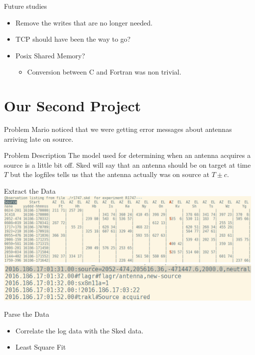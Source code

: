 \documentclass{beamer}
\begin{document}
    \begin{frame}{Future studies}
        \begin{itemize}[<+-|alert@+>]
            \item Remove the writes that are no longer needed.
            \item TCP should have been the way to go?
            \item Posix Shared Memory?
            \begin{itemize}[<+-|alert@+>]
                \item Conversion between C and Fortran was non trivial.
            \end{itemize}
        \end{itemize}
    \end{frame}


    \section{Our Second Project}

    \begin{frame}{Problem}
        Mario noticed that we were getting error messages about antennas
        arriving late on source.
    \end{frame}

    \begin{frame}{Problem Description}
        The model used for determining when an antenna acquires a source is a
        little bit off. Sked will say that an antenna should be on target at
        time $T$ but the logfiles tells us that the antenna actually was on
        source at $T \pm c$.
    \end{frame}
    \begin{frame}{Extract the Data}
        \centering
        \includegraphics[width=1\columnwidth]{skds}\\[2ex]
        \includegraphics[width=0.75\columnwidth]{logs}
    \end{frame}
    \begin{frame}{Parse the Data}
        \begin{itemize}[<+-|alert@+>]
            \item Correlate the log data with the Sked data.
            \item Least Square Fit
        \end{itemize}
    \end{frame}
\end{document}
